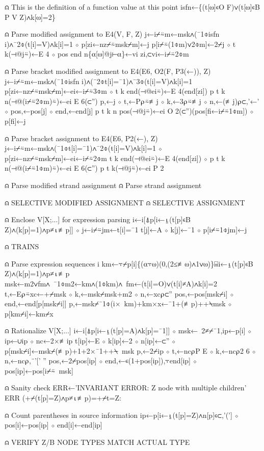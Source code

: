 \documentclass{article}%
\begin{document}
⍝ This is the definition of a function value at this point
         isfn←\{(t[⍵]∊O F)∨(t[⍵]∊B P V Z)∧k[⍵]=2\}

⍝ Parse modified assignment to E4(V, F, Z)
         j←i⌿⍨m←msk∧(¯1⌽isfn i)∧¯2⌽(t[i]=V)∧k[i]=1 ⋄ p[zi←nz⌿⍨msk⌿m]←j
         p[i⌿⍨(1⌽m)∨2⌽m]←2⌿j ⋄ t k(⊣@j⍨)←E 4 ⋄ pos end n\{⍺[⍵]@j⊢⍺\}←vi zi,⊂vi←i⌿⍨2⌽m

⍝ Parse bracket modified assignment to E4(E6, O2(F, P3(←)), Z)
         j←i⌿⍨m←msk∧(¯1⌽isfn i)∧(¯2⌽t[i]=¯1)∧¯3⌽(t[i]=V)∧k[i]=1
         p[zi←nz⌿⍨msk⌿m]←ei←i⌿⍨3⌽m ⋄ t k end(⊣@ei⍨)←E 4(end[zi])
         p t k n(⊣@(i⌿⍨2⌽m)⍨)←ei E 6(⊂'')
         p,←j ⋄ t,←P⍴⍨≢j ⋄ k,←3⍴⍨≢j ⋄ n,←(≢j)⍴⊂,'←' ⋄ pos,←pos[j] ⋄ end,←end[j]
         p t k n pos(⊣@j⍨)←ei O 2(⊂'')(pos[fi←i⌿⍨1⌽m]) ⋄ p[fi]←j

⍝ Parse bracket assignment to E4(E6, P2(←), Z)
         j←i⌿⍨m←msk∧(¯1⌽t[i]=¯1)∧¯2⌽(t[i]=V)∧k[i]=1 ⋄ p[zi←nz⌿⍨msk⌿m]←ei←i⌿⍨2⌽m
         t k end(⊣@ei⍨)←E 4(end[zi]) ⋄ p t k n(⊣@(i⌿⍨1⌽m)⍨)←ei E 6(⊂'')
         p t k(⊣@j⍨)←ei P 2

⍝ Parse modified strand assignment
⍝ Parse strand assignment

⍝ SELECTIVE MODIFIED ASSIGNMENT
⍝ SELECTIVE ASSIGNMENT

⍝ Enclose V[X;...] for expression parsing
         i←i[⍋p[i←⍸(t[p]∊B Z)∧(k[p]=1)∧p≠⍳≢p]] ⋄ j←i⌿⍨jm←t[i]=¯1
         t[j]←A ⋄ k[j]←¯1 ⋄ p[i⌿⍨1⌽jm]←j

⍝ TRAINS

⍝ Parse expression sequences
         i km←⍪⌿p[i]\{(⍺⍪⍵)(0,(2≤≢⍵)∧1∨⍵)\}⌸i←⍸(t[p]∊B Z)∧(k[p]=1)∧p≠⍳≢p
         msk←m2∨fm∧~¯1⌽m2←km∧(1⌽km)∧~fm←(t[i]=O)∨(t[i]≠A)∧k[i]=2
         t,←E⍴⍨xc←+⌿msk ⋄ k,←msk⌿msk+m2 ⋄ n,←xc⍴⊂''
         pos,←pos[msk⌿i] ⋄ end,←end[p[msk⌿i]]
         p,←msk⌿¯1⌽(i×~km)+km×x←¯1+(≢p)++⍀msk ⋄ p[km⌿i]←km⌿x

⍝ Rationalize V[X;...]
         i←i[⍋p[i←⍸(t[p]=A)∧k[p]=¯1]] ⋄ msk←~2≠⌿¯1,ip←p[i] ⋄ ip←∪ip ⋄ nc←2×≢ip
         t[ip]←E ⋄ k[ip]←2 ⋄ n[ip]←⊂'' ⋄ p[msk⌿i]←msk⌿(≢p)+1+2×¯1++⍀~msk
         p,←2⌿ip ⋄ t,←nc⍴P E ⋄ k,←nc⍴2 6 ⋄ n,←nc⍴,¨'[' ''
         pos,←2⌿pos[ip] ⋄ end,←∊(1+pos[ip]),⍪end[ip] ⋄ pos[ip]←pos[i⌿⍨~msk]

⍝ Sanity check
         ERR←'INVARIANT ERROR: Z node with multiple children'
         ERR (+⌿(t[p]=Z)∧p≠⍳≢p)=+⌿t=Z:

⍝ Count parentheses in source information
         ip←p[i←⍸(t[p]=Z)∧n[p]∊⊂,'('] ⋄ pos[i]←pos[ip] ⋄ end[i]←end[ip]

⍝ VERIFY Z/B NODE TYPES MATCH ACTUAL TYPE
\end{document}
